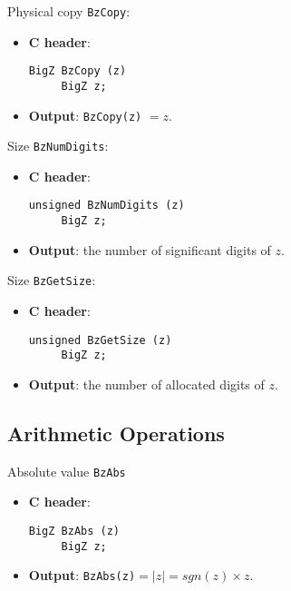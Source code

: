 \begin{func} Physical copy  \verb+BzCopy+:
\begin{itemize}
  \item{\bf C header}:
\begin{verbatim}
BigZ BzCopy (z)
     BigZ z;
\end{verbatim}
  \item{\bf Output}: \verb+BzCopy(z)+ $= z  $.
\end{itemize}
\end{func}

\begin{func} Size  \verb+BzNumDigits+:
\begin{itemize}
  \item{\bf C header}:
\begin{verbatim}
unsigned BzNumDigits (z)
     BigZ z;
\end{verbatim}
  \item{\bf Output}: the number of significant digits of $z$.
\end{itemize}
\end{func}
 
\begin{func} Size  \verb+BzGetSize+:
\begin{itemize}
  \item{\bf C header}:
\begin{verbatim}
unsigned BzGetSize (z)
     BigZ z;
\end{verbatim}
  \item{\bf Output}: the number of allocated digits of $z$.
\end{itemize}
\end{func}
 
\subsection{Arithmetic Operations}
 
\begin{func} Absolute value \verb+BzAbs+
\begin{itemize}
   \item {\bf C header}: 
\begin{verbatim}
BigZ BzAbs (z)  
     BigZ z;
\end{verbatim}
   \item {\bf Output}: \verb+BzAbs(z)+$= |z| = sgn(z) \times z.$
\end{itemize}
\end{func}
 
